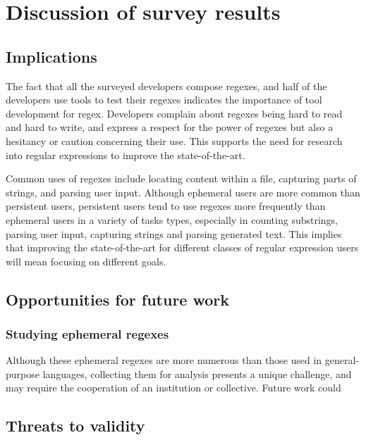 \section{Discussion of survey results}
\subsection{Implications}

The fact that all the surveyed developers compose regexes, and half of the developers use tools to test their regexes indicates the importance of tool development for regex.  Developers complain about regexes being hard to read and hard to write, and express a respect for the power of regexes but also a hesitancy or caution concerning their use.  This supports the need for research into regular expressions to improve the state-of-the-art.

Common uses of regexes include locating content within a file, capturing parts of strings, and parsing user input.  Although ephemeral users are more common than persistent users, persistent users tend to use regexes more frequently than ephemeral users in a variety of tasks types, especially in counting substrings, parsing user input, capturing strings and parsing generated text.  This implies that improving the state-of-the-art for different classes of regular expression users will mean focusing on different goals.

\subsection{Opportunities for future work}

\subsubsection{Studying ephemeral regexes}
Although these ephemeral regexes are more numerous than those used in general-purpose languages, collecting them for analysis presents a unique challenge, and may require the cooperation of an institution or collective.  Future work could

\subsection{Threats to validity}





